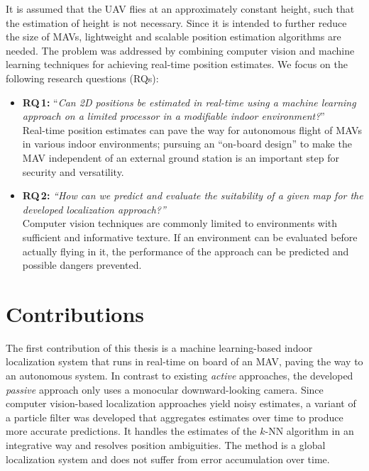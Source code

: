 \documentclass[11pt]{report}
\begin{document}
It is assumed that the UAV flies at an approximately constant height,
such that the estimation of height is not necessary. Since it is
intended to further reduce the size of MAVs, lightweight and scalable
position estimation algorithms are needed. The problem was addressed
by combining computer vision and machine learning techniques for
achieving real-time position estimates. We focus on the following
research questions (RQs):
\begin{itemize}
\item \textbf{RQ\,1:} ``\emph{Can 2D positions be estimated in real-time using a
    machine learning approach on a limited processor in a modifiable
    indoor environment?}''\vspace*{0.05cm}\\
  Real-time position estimates can pave the way for autonomous flight
  of MAVs in various indoor environments; pursuing an ``on-board
  design'' to make the MAV independent of an external ground station
  is an important step for security and versatility.
\item \textbf{RQ\,2:} \emph{``How can we predict and evaluate the suitability of a
    given map for the developed localization approach?''}  \vspace*{0.15cm}\\
  Computer vision techniques are commonly limited to environments with
  sufficient and informative texture. If an environment can be
  evaluated before actually flying in it, the performance of the
  approach can be predicted and possible dangers prevented.
\end{itemize}

\section{Contributions}
\label{sec:contributions}

The first contribution of this thesis is a machine learning-based
indoor localization system that runs in real-time on board of an MAV,
paving the way to an autonomous system. In contrast to existing
\emph{active} approaches, the developed \emph{passive} approach only
uses a monocular downward-looking camera. Since computer vision-based
localization approaches yield noisy estimates, a variant of a particle
filter was developed that aggregates estimates over time to produce
more accurate predictions. It handles the estimates of the $k$-NN
algorithm in an integrative way and resolves position ambiguities. The
method is a global localization system and does not suffer from error
accumulation over time.
\end{document}
